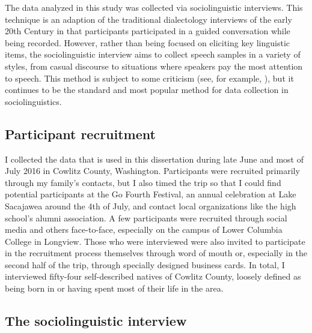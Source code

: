 The data analyzed in this study was collected via sociolinguistic interviews. This technique is an adaption of the traditional dialectology interviews of the early 20th Century in that participants participated in a guided conversation while being recorded. However, rather than being focused on eliciting key linguistic items, the sociolinguistic interview aims to collect speech samples in a variety of styles, from casual discourse to situations where speakers pay the most attention to speech. This method is subject to some criticism (see, for example, \citealt{wolfson_1976}), but it continues to be the standard and most popular method for data collection in sociolinguistics.

\subsection{Participant recruitment}

I collected the data that is used in this dissertation during late June and most of July 2016 in Cowlitz County, Washington. Participants were recruited primarily through my family’s contacts, but I also timed the trip so that I could find potential participants at the Go Fourth Festival, an annual celebration at Lake Sacajawea around the 4th of July, and contact local organizations like the high school’s alumni association. A few participants were recruited through social media and others face-to-face, especially on the campus of Lower Columbia College in Longview. Those who were interviewed were also invited to participate in the recruitment process themselves through word of mouth or, especially in the second half of the trip, through specially designed business cards. In total, I interviewed fifty-four self-described natives of Cowlitz County, loosely defined as being born in or having spent most of their life in the area.

\subsection{The sociolinguistic interview}

